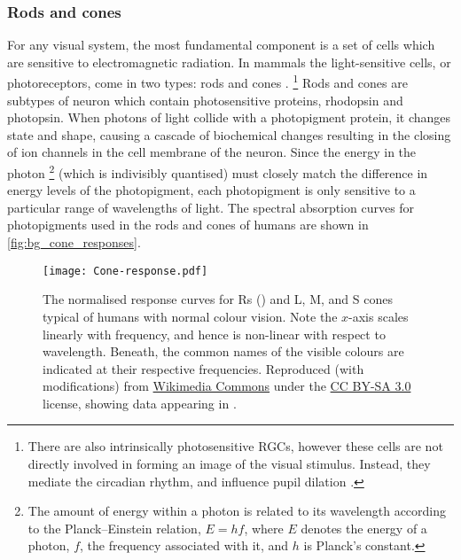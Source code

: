 \subsubsection{Rods and cones}

For any visual system, the most fundamental component is a set of cells which are sensitive to electromagnetic radiation.
In mammals the light-sensitive cells, or photoreceptors, come in two types: rods and cones \citep[Chapter~11]{nsbook}.%
\footnote{
There are also intrinsically photosensitive \aclp{RGC}, however these cells are not directly involved in forming an image of the visual stimulus.
Instead, they mediate the circadian rhythm, and influence pupil dilation \citep{Berson2002,Ecker2010,Wong2005}.
}
Rods and cones are subtypes of neuron which contain photosensitive proteins, rhodopsin and photopsin.
When photons of light collide with a photopigment protein, it changes state and shape, causing a cascade of biochemical changes resulting in the closing of ion channels in the cell membrane of the neuron.
Since the energy in the photon%
\footnote{
The amount of energy within a photon is related to its wavelength according to the Planck--Einstein relation,
$E = h f$, where $E$ denotes the energy of a photon, $f$, the frequency associated with it, and $h$ is Planck's constant.%
}
(which is indivisibly quantised) must closely match the difference in energy levels of the photopigment, each photopigment is only sensitive to a particular range of wavelengths of light.
The spectral absorption curves for photopigments used in the rods and cones of humans are shown in \autoref{fig:bg_cone_responses}.

\begin{figure}[htbp]
\centering
\texttt{[image: Cone-response.pdf]}
\caption{
The normalised response curves for \aclp{R} () and \acf{L}, \acf{M}, and \acf{S} cones typical of humans with normal colour vision.
Note the $x$-axis scales linearly with frequency, and hence is non-linear with respect to wavelength.
Beneath, the common names of the visible colours are indicated at their respective frequencies.
Reproduced (with modifications) from \href{https://commons.wikimedia.org/wiki/File:Cone-response.svg}{Wikimedia Commons} under the \href{https://creativecommons.org/licenses/by-sa/3.0/deed.en}{CC BY-SA 3.0} license, showing data appearing in \citet{Bowmaker1980}.
}
\label{fig:bg_cone_responses}
\end{figure}

